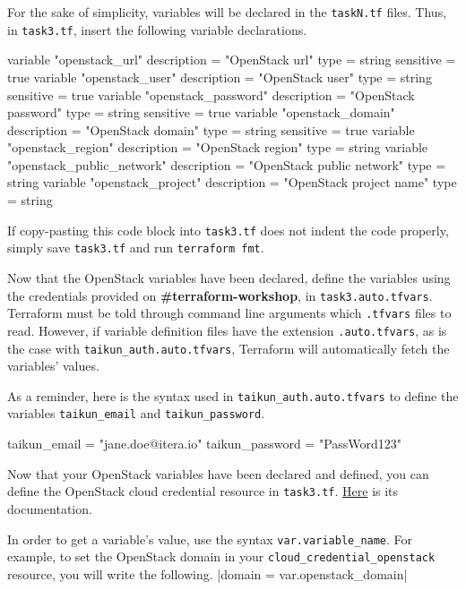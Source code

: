 For the sake of simplicity, variables will be declared in the \texttt{taskN.tf} files.
Thus, in \texttt{task3.tf}, insert the following variable declarations.
\begin{tf}
variable "openstack_url" {
  description = "OpenStack url"
  type        = string
  sensitive   = true
}
variable "openstack_user" {
  description = "OpenStack user"
  type        = string
  sensitive   = true
}
variable "openstack_password" {
  description = "OpenStack password"
  type        = string
  sensitive   = true
}
variable "openstack_domain" {
  description = "OpenStack domain"
  type        = string
  sensitive   = true
}
variable "openstack_region" {
  description = "OpenStack region"
  type        = string
}
variable "openstack_public_network" {
  description = "OpenStack public network"
  type        = string
}
variable "openstack_project" {
  description = "OpenStack project name"
  type        = string
}
\end{tf}
\begin{note}
  If copy-pasting this code block into \texttt{task3.tf} does not indent the code properly,
  simply save \texttt{task3.tf} and run \texttt{terraform fmt}.
\end{note}

Now that the OpenStack variables have been declared,
define the variables using the credentials provided on \textbf{\#terraform-workshop}, in \texttt{task3.auto.tfvars}.\\

Terraform must be told through command line arguments which \texttt{.tfvars} files to read.
However, if variable definition files have the extension \texttt{.auto.tfvars}, as is the case with
\texttt{taikun\_auth.auto.tfvars}, Terraform will automatically fetch the variables' values.
\begin{tip}
As a reminder, here is the syntax used in \texttt{taikun\_auth.auto.tfvars} to define the variables \texttt{taikun\_email}
and \texttt{taikun\_password}.
\begin{tf}
taikun_email = "jane.doe@itera.io"
taikun_password = "PassWord123"
\end{tf}
\end{tip}

Now that your OpenStack variables have been declared and defined, you can define the OpenStack cloud credential resource in \texttt{task3.tf}.
\href{https://intuinewin.github.io/taikun-docs/resources/cloud_credential_openstack.html}{Here} is its documentation.

\begin{tip}
In order to get a variable's value, use the syntax \texttt{var.variable\_name}.
For example, to set the OpenStack domain in your \texttt{cloud\_credential\_openstack} resource,
  you will write the following. |domain = var.openstack_domain|
\end{tip}

